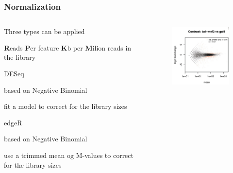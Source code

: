 \documentclass{beamer}
\begin{document}

\begin{frame}
\frametitle{Normalization}
\begin{columns}
\begin{column}{0.6\textwidth}
  \bit
      \item Three types can be applied
        \bit
            \item \textbf{R}eads \textbf{P}er feature \textbf{K}b per \textbf{M}ilion reads in the library
        \eit
      \item DESeq
        \bit
            \item based on Negative Binomial
            \item fit a model to correct for the library sizes
        \eit
      \item edgeR
        \bit
            \item based on Negative Binomial
            \item use a trimmed mean og M-values to correct for the library sizes
        \eit
  \eit
  \end{column}

\begin{column}{0.6\textwidth}
      \begin{figure}[ht]
      \centering
      \includegraphics[width=50mm]{diagramas/Seleccio_015.png}
      \end{figure}
\end{column}
\end{columns}
\end{frame}
\end{document}
